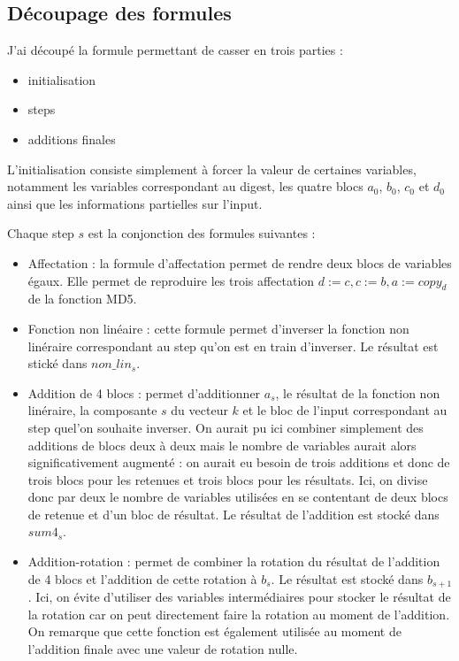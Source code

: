 \documentclass{article}
\begin{document}
\subsection{Découpage des formules}
J'ai découpé la formule permettant de casser en trois parties : 
\begin{itemize}
\item initialisation
\item steps
\item additions finales
\end{itemize}
 
L'initialisation consiste simplement à forcer la valeur de certaines variables, notamment les variables correspondant au digest, les quatre blocs $a_0$, $b_0$, $c_0$ et $d_0$ ainsi que les informations partielles sur l'input.
\par
Chaque step $s$ est la conjonction des formules suivantes : 
\begin{itemize}
  \item Affectation : la formule d'affectation permet de rendre deux blocs de variables égaux. Elle permet de reproduire les trois affectation $d:= c, c:=b , a:= copy_d$ de la fonction MD5.
  \item Fonction non linéaire : cette formule permet d'inverser la fonction non linéraire correspondant au step qu'on est en train d'inverser. Le résultat est stické dans $non\_lin_s$.
  \item Addition de 4 blocs : permet d'additionner $a_s$, le résultat de la fonction non linéraire, la composante $s$ du vecteur $k$ et le bloc de l'input correspondant au step quel'on souhaite inverser. On aurait pu ici combiner simplement des additions de blocs deux à deux mais le nombre de variables aurait alors significativement augmenté : on aurait eu besoin de trois additions et donc de trois blocs pour les retenues et trois blocs pour les résultats. Ici, on divise donc par deux le nombre de variables utilisées en se contentant de deux blocs de retenue et d'un bloc de résultat. Le résultat de l'addition est stocké dans $sum4_s$.
  \item Addition-rotation : permet de combiner la rotation du résultat de l'addition de 4 blocs et l'addition de cette rotation à $b_s$. Le résultat est stocké dans $b_{s+1}$. Ici, on évite d'utiliser des variables intermédiaires pour stocker le résultat de la rotation car on peut directement faire la rotation au moment de l'addition. On remarque que cette fonction est également utilisée au moment de l'addition finale avec une valeur de rotation nulle.
\end{itemize}
\end{document}
